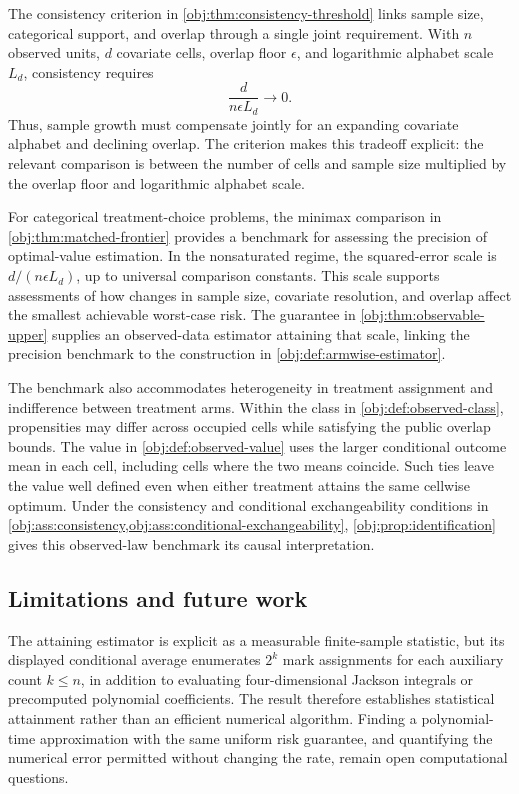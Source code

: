 \documentclass[11pt]{article}
\begin{document}
The consistency criterion in \cref{obj:thm:consistency-threshold} links sample size, categorical support, and overlap through a single joint requirement. With \(n\) observed units, \(d\) covariate cells, overlap floor \(\epsilon\), and logarithmic alphabet scale \(L_d\), consistency requires
\[
\frac{d}{n\epsilon L_d}\longrightarrow 0.
\]
Thus, sample growth must compensate jointly for an expanding covariate alphabet and declining overlap. The criterion makes this tradeoff explicit: the relevant comparison is between the number of cells and sample size multiplied by the overlap floor and logarithmic alphabet scale.

For categorical treatment-choice problems, the minimax comparison in \cref{obj:thm:matched-frontier} provides a benchmark for assessing the precision of optimal-value estimation. In the nonsaturated regime, the squared-error scale is \(d/(n\epsilon L_d)\), up to universal comparison constants. This scale supports assessments of how changes in sample size, covariate resolution, and overlap affect the smallest achievable worst-case risk. The guarantee in \cref{obj:thm:observable-upper} supplies an observed-data estimator attaining that scale, linking the precision benchmark to the construction in \cref{obj:def:armwise-estimator}.

The benchmark also accommodates heterogeneity in treatment assignment and indifference between treatment arms. Within the class in \cref{obj:def:observed-class}, propensities may differ across occupied cells while satisfying the public overlap bounds. The value in \cref{obj:def:observed-value} uses the larger conditional outcome mean in each cell, including cells where the two means coincide. Such ties leave the value well defined even when either treatment attains the same cellwise optimum. Under the consistency and conditional exchangeability conditions in \cref{obj:ass:consistency,obj:ass:conditional-exchangeability}, \cref{obj:prop:identification} gives this observed-law benchmark its causal interpretation.

\subsection{Limitations and future work}

The attaining estimator is explicit as a measurable finite-sample statistic, but its displayed conditional average enumerates \(2^k\) mark assignments for each auxiliary count \(k\le n\), in addition to evaluating four-dimensional Jackson integrals or precomputed polynomial coefficients. The result therefore establishes statistical attainment rather than an efficient numerical algorithm. Finding a polynomial-time approximation with the same uniform risk guarantee, and quantifying the numerical error permitted without changing the rate, remain open computational questions.
\end{document}
